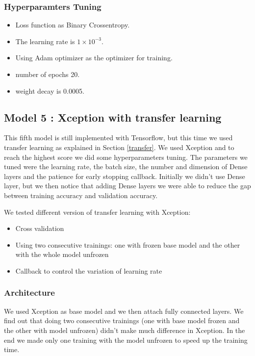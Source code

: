 \documentclass[conference]{IEEEtran}
\begin{document}
\subsubsection{Hyperparamters Tuning}
\begin{itemize}
    \item Loss function as Binary Crossentropy.
    \item The learning rate is $1\times10^{-3}$.
    \item Using Adam optimizer as the optimizer for training. 
    \item number of epochs 20.
    \item weight decay is 0.0005.
\end{itemize}

\subsection{Model 5 : Xception with transfer learning}
This fifth model is still implemented with Tensorflow, but this time we used transfer learning as explained in Section \ref{transfer}.
We used Xception and to reach the highest score we did some hyperparameters tuning. The parameters we tuned were the learning rate, the batch size, the number and dimension of Dense layers and the patience for early stopping callback.
Initially we didn't use Dense layer, but we then notice that adding Dense layers we were able to reduce the gap between training accuracy and validation accuracy.

We tested different version of transfer learning with Xception:
\begin{itemize}
    \item Cross validation
    \item Using two consecutive trainings: one with frozen base model and the other with the whole model unfrozen
    \item Callback to control the variation of learning rate
\end{itemize}

\subsubsection{Architecture}
We used Xception as base model and we then attach fully connected layers.
We find out that doing two consecutive trainings (one with base model frozen 
and the other with model unfrozen) didn't make much difference in Xception.
In the end we made only one training with the model unfrozen to speed up
the training time.
\end{document}
